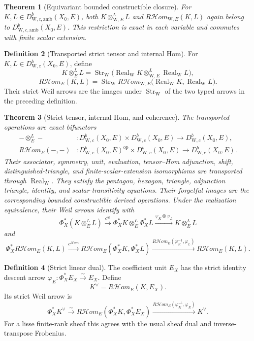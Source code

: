 \documentclass[10pt]{article}
\newtheorem{theorem}{Theorem}[section]
\theoremstyle{definition}
\newtheorem{definition}[theorem]{Definition}
\newcommand{\WeilD}{D^b_{\mathrm W,c}}
\newcommand{\RHom}{R\mathcal Hom}
\begin{document}
\begin{theorem}[Equivariant bounded constructible closure]
For \(K,L\in D^b_{\mathrm W,c,\mathrm{amb}}(X_0,E)\), both
\(K\otimes_{\mathrm W,E}^LL\) and
\(R\mathcal Hom_{\mathrm W,E}(K,L)\) again belong to
\(D^b_{\mathrm W,c,\mathrm{amb}}(X_0,E)\).  This restriction is exact in
each variable and commutes with finite scalar extension.
\end{theorem}

\begin{definition}[Transported strict tensor and internal Hom]
For \(K,L\in\WeilD(X_0,E)\), define
\[
 K\otimes_E^LL=\operatorname{Str}_{\mathrm W}
  \bigl(\operatorname{Real}_{\mathrm W}K
       \otimes_{\mathrm W,E}^L\operatorname{Real}_{\mathrm W}L\bigr),
\]
\[
 \RHom_E(K,L)=\operatorname{Str}_{\mathrm W}
  R\mathcal Hom_{\mathrm W,E}
  \bigl(\operatorname{Real}_{\mathrm W}K,
        \operatorname{Real}_{\mathrm W}L\bigr).
\]
Their strict Weil arrows are the images under
\(\operatorname{Str}_{\mathrm W}\) of the two typed arrows in the preceding
definition.
\end{definition}

\begin{theorem}[Strict tensor, internal Hom, and coherence]
The transported operations are exact bifunctors
\[
\begin{aligned}
 -\otimes_E^L- &: \WeilD(X_0,E)\times\WeilD(X_0,E)
                                   \longrightarrow\WeilD(X_0,E),\\
 \RHom_E(-,-) &: \WeilD(X_0,E)^{\mathrm{op}}\times\WeilD(X_0,E)
                                   \longrightarrow\WeilD(X_0,E).
\end{aligned}
\]
Their associator, symmetry, unit, evaluation, tensor--Hom adjunction, shift,
distinguished-triangle, and finite-scalar-extension isomorphisms are transported through
\(\operatorname{Real}_{\mathrm W}\).  They satisfy the pentagon, hexagon,
triangle, adjunction triangle, identity, and scalar-transitivity equations.
Their forgetful images are the corresponding bounded constructible derived
operations.
Under the realization equivalence, their Weil arrows identify with
\[
 \Phi_X^*(K\otimes_E^LL)\xrightarrow{c^\otimes}
 \Phi_X^*K\otimes_E^L\Phi_X^*L
 \xrightarrow{\varphi_K\otimes\varphi_L}K\otimes_E^LL
\]
and
\[
 \Phi_X^*\RHom_E(K,L)\xrightarrow{c^{\mathcal Hom}}
 \RHom_E(\Phi_X^*K,\Phi_X^*L)
 \xrightarrow{\RHom_E(\varphi_K^{-1},\varphi_L)}\RHom_E(K,L).
\]
\end{theorem}

\begin{definition}[Strict linear dual]
The coefficient unit \(E_X\) has the strict identity descent arrow
\(\varphi_E:\Phi_X^*E_X\xrightarrow{\sim}E_X\).  Define
\[
                         K^\vee=\RHom_E(K,E_X).
\]
Its strict Weil arrow is
\[
 \Phi_X^*K^\vee
 \xrightarrow{\sim}\RHom_E(\Phi_X^*K,\Phi_X^*E_X)
 \xrightarrow{\RHom_E(\varphi_K^{-1},\varphi_E)}K^\vee.
\]
For a lisse finite-rank sheaf this agrees with the usual sheaf dual and
inverse-transpose Frobenius.
\end{definition}
\end{document}
